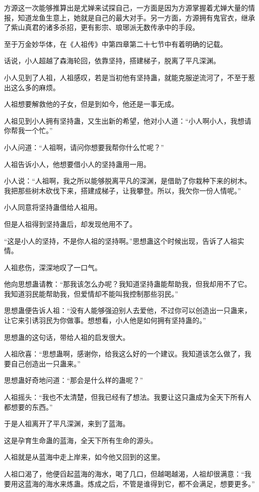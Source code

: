 \begin{this_body}
方源这一次能够推算出是尤婵来试探自己，一方面是因为方源掌握着尤婵大量的情报，知道龙鱼生意上，她就是自己的最大对手。另一方面，方源拥有鬼官衣，继承了紫山真君的诸多杀招，更有影宗、琅琊派无数传承中的手段。

至于万金妙华体，在《人祖传》中第四章第二十七节中有着明确的记载。

话说，小人超越了森海轮回，依靠坚持，搭建梯子，脱离了平凡深渊。

小人见到了人祖，人祖感叹，若是当初他有坚持蛊，就能克服逆流河了，不至于惹出这么多的麻烦。

人祖想要解救他的子女，但是到如今，他还是一事无成。

人祖见到小人拥有坚持蛊，又生出新的希望，他对小人道：“小人啊小人，我想请你帮我一个忙。”

小人问道：“人祖啊，请问你想要我帮你什么忙呢？”

人祖告诉小人，他想要借小人的坚持蛊用一用。

小人说：“人祖啊，我之所以能够脱离平凡的深渊，是借助了你栽种下来的树木。我把那些树木砍伐下来，搭建成梯子，让我攀登。所以，我欠你一份人情呢。”

小人同意将坚持蛊借给人祖用。

但是人祖得到坚持蛊后，却发现他用不了。

“这是小人的坚持，不是你人祖的坚持啊。”思想蛊这个时候出现，告诉了人祖实情。

人祖悲伤，深深地叹了一口气。

他向思想蛊请教：“那我该怎么办呢？我知道坚持蛊能帮助我，但我却用不了它。我知道羽民能帮助我，但爱情却不能叫我控制那些羽民。”

思想蛊便告诉人祖：“没有人能够强迫别人去爱他，不过你可以创造出一只蛊来，让它来引诱羽民为你做事。想想看，小人他是如何拥有坚持蛊的。”

思想蛊的这句话，带给人祖的启发很大。

人祖欣喜：“思想蛊啊，感谢你，给我这么好的一个建议。我知道该怎么做了，我要自己创造出一只蛊来。”

思想蛊好奇地问道：“那会是什么样的蛊呢？”

人祖摇头：“我也不太清楚，但我已经有了想法。我要让这只蛊成为全天下所有人都想要的东西。”

于是人祖离开了平凡深渊，来到了蓝海。

这是孕育生命蛊的蓝海，全天下所有生命的源头。

人祖就是从蓝海中走上岸来，如今他又回到的这里。

人祖口渴了，他便舀起蓝海的海水，喝了几口，但越喝越渴，人祖却很满意：“我要用这蓝海的海水来炼蛊。炼成之后，不管是谁得到它，都不会满足，想要更多。”


\end{this_body}
